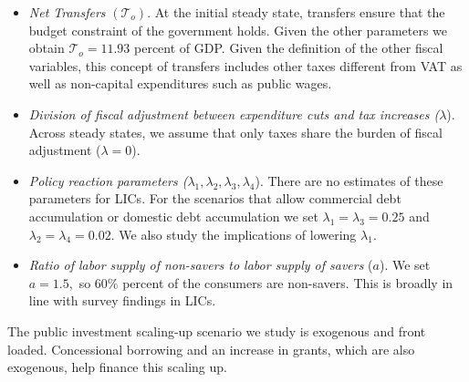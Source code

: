 \documentclass[11pt]{article}
\begin{document}
\begin{itemize}
\item \textit{Net Transfers }$(\mathcal{T}_{o})$. At the initial steady
state, transfers ensure that the budget constraint of the government holds.
Given the other parameters we obtain $\mathcal{T}_{o}=11.93$ percent of GDP.
Given the definition of the other fiscal variables, this concept of
transfers includes other taxes different from VAT as well as non-capital
expenditures such as public wages.

\item \textit{Division of fiscal adjustment between expenditure cuts and tax
increases (}$\lambda $). Across steady states, we assume that only taxes
share the burden of fiscal adjustment ($\lambda =0$).

\item \textit{Policy reaction parameters (}$\lambda _{1},\lambda
_{2},\lambda _{3},\lambda _{4}$). There are no estimates of these parameters
for LICs. For the scenarios that allow commercial debt accumulation or
domestic debt accumulation we set $\lambda _{1}=\lambda _{3}=0.25$ and $%
\lambda _{2}=\lambda _{4}=0.02.$ We also study the implications of lowering $%
\lambda _{1}$.

\item \textit{Ratio of labor supply of non-savers to labor supply of savers }%
($a$). We set $a=1.5,$ so $60\%$ percent of the consumers are non-savers.
This is broadly in line with survey findings in LICs.
\end{itemize}

The public investment scaling-up scenario we study is exogenous and front
loaded. Concessional borrowing and an increase in grants, which are also
exogenous, help finance this scaling up.
\end{document}
